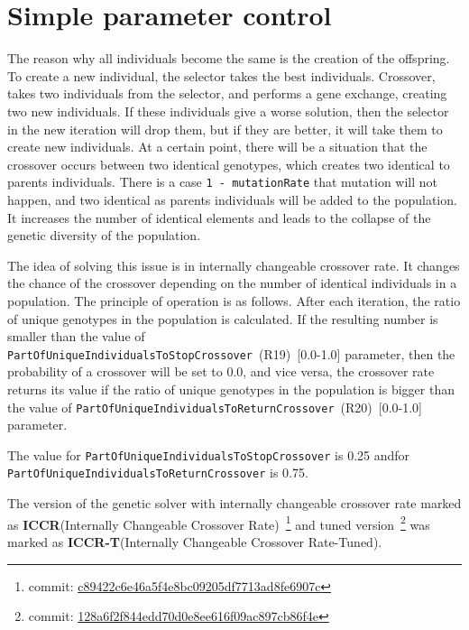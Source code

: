\section{Simple parameter control}

The reason why all individuals become the same is the creation of the offspring. To create a new individual, the selector takes the best individuals. Crossover, takes two individuals from the selector, and performs a gene exchange, creating two new individuals. If these individuals give a worse solution, then the selector in the new iteration will drop them, but if they are better, it will take them to create new individuals. At a certain point, there will be a situation that the crossover occurs between two identical genotypes, which creates two identical to parents individuals. There is a case \texttt{1~-~mutationRate} that mutation will not happen, and two identical as parents individuals will be added to the population. It increases the number of identical elements and leads to the collapse of the genetic diversity of the population.

The idea of solving this issue is in internally changeable crossover rate. It changes the chance of the crossover depending on the number of identical individuals in a population. 
The principle of operation is as follows. After each iteration, the ratio of unique genotypes in the population is calculated. If the resulting number is smaller than the value of \texttt{PartOfUniqueIndividualsToStopCrossover}~(R19)~[0.0-1.0] parameter, then the probability of a crossover will be set to 0.0, and vice versa, the crossover rate returns its value if the ratio of unique genotypes in the population is bigger than the value of \texttt{PartOfUniqueIndividualsToReturnCrossover}~(R20)~[0.0-1.0] parameter.

The value for \texttt{PartOfUniqueIndividualsToStopCrossover} is 0.25 and\linebreak for \texttt{PartOfUniqueIndividualsToReturnCrossover} is 0.75.

The version of the genetic solver with internally changeable crossover rate marked as \textbf{ICCR}(Internally Changeable Crossover Rate)~\footnote{commit: \href{https://git-st.inf.tu-dresden.de/mquat/mquat2/commit/c89422c6e46a5f4e8bc09205df7713ad8fe6907c}{c89422c6e46a5f4e8bc09205df7713ad8fe6907c}} and tuned version~\footnote{commit: \href{https://git-st.inf.tu-dresden.de/mquat/mquat2/commit/128a6f2f844edd70d0e8ee616f09ac897cb86f4e}{128a6f2f844edd70d0e8ee616f09ac897cb86f4e}} was marked as \textbf{ICCR-T}(Internally Changeable Crossover Rate-Tuned).

